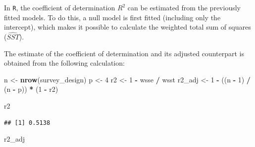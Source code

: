 \documentclass[
  english,
  12pt,
]{book}
\newenvironment{Shaded}{\begin{snugshade}}{\end{snugshade}}
\newcommand{\AttributeTok}[1]{\textcolor[rgb]{0.13,0.29,0.53}{#1}}
\newcommand{\DecValTok}[1]{\textcolor[rgb]{0.00,0.00,0.81}{#1}}
\newcommand{\FunctionTok}[1]{\textcolor[rgb]{0.13,0.29,0.53}{\textbf{#1}}}
\newcommand{\NormalTok}[1]{#1}
\newcommand{\OtherTok}[1]{\textcolor[rgb]{0.56,0.35,0.01}{#1}}
\newcommand{\SpecialCharTok}[1]{\textcolor[rgb]{0.81,0.36,0.00}{\textbf{#1}}}
\begin{document}
In \texttt{R}, the coefficient of determination \(R^{2}\) can be estimated from the previously fitted models. To do this, a null model is first fitted (including only the intercept), which makes it possible to calculate the weighted total sum of squares (\(\widehat{SST}\)).

\begin{Shaded}
\end{Shaded}

The estimate of the coefficient of determination and its adjusted counterpart is obtained from the following calculation:

\begin{Shaded}
\begin{Highlighting}[]
\NormalTok{n }\OtherTok{\textless{}{-}} \FunctionTok{nrow}\NormalTok{(survey\_design)}
\NormalTok{p }\OtherTok{\textless{}{-}} \DecValTok{4}
\NormalTok{r2 }\OtherTok{\textless{}{-}} \DecValTok{1} \SpecialCharTok{{-}}\NormalTok{ wsse }\SpecialCharTok{/}\NormalTok{ wsst}
\NormalTok{r2\_adj }\OtherTok{\textless{}{-}} \DecValTok{1} \SpecialCharTok{{-}}\NormalTok{ ((n }\SpecialCharTok{{-}} \DecValTok{1}\NormalTok{) }\SpecialCharTok{/}\NormalTok{ (n }\SpecialCharTok{{-}}\NormalTok{ p)) }\SpecialCharTok{*}\NormalTok{ (}\DecValTok{1} \SpecialCharTok{{-}}\NormalTok{ r2)}

\NormalTok{r2}
\end{Highlighting}
\end{Shaded}

\begin{verbatim}
## [1] 0.5138
\end{verbatim}

\begin{Shaded}
\begin{Highlighting}[]
\NormalTok{r2\_adj}
\end{Highlighting}
\end{Shaded}
\end{document}

